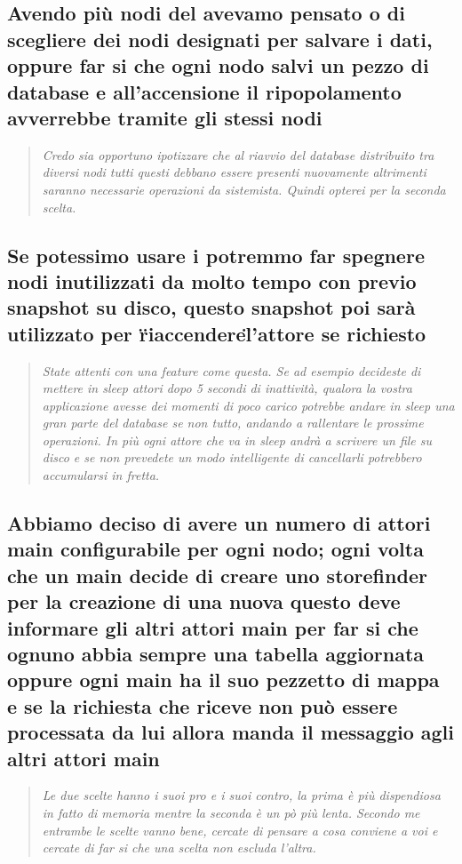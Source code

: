 \documentclass{scalatekids-article}
\begin{document}
\subsection{Avendo più nodi del  avevamo pensato o di scegliere dei nodi designati per salvare i dati, oppure far si che ogni nodo salvi un pezzo di database e all'accensione il ripopolamento avverrebbe tramite gli stessi nodi\\}
\begin{quote}
  \textit{Credo sia opportuno ipotizzare che al riavvio del database distribuito tra diversi nodi tutti questi debbano essere presenti nuovamente altrimenti saranno necessarie operazioni da sistemista. Quindi opterei per la seconda scelta.}
\end{quote}
\subsection{Se potessimo usare i  potremmo far spegnere nodi inutilizzati da molto tempo con previo snapshot su disco, questo snapshot poi sarà utilizzato per \"riaccendere\" l'attore se richiesto\\}
\begin{quote}
  \textit{State attenti con una feature come questa. Se ad esempio decideste di mettere in sleep attori dopo 5 secondi di inattività, qualora la vostra applicazione avesse dei momenti di poco carico potrebbe andare in sleep una gran parte del database se non tutto, andando a rallentare le prossime operazioni. In più ogni attore che va in sleep andrà a scrivere un file su disco e se non prevedete un modo intelligente di cancellarli potrebbero accumularsi in fretta.}
\end{quote}
\subsection{Abbiamo deciso di avere un numero di attori main configurabile per ogni nodo; ogni volta che un main decide di creare uno storefinder per la creazione di una nuova  questo deve informare gli altri attori main per far si che ognuno abbia sempre una tabella aggiornata oppure ogni main ha il suo pezzetto di mappa e se la richiesta che riceve non può essere processata da lui allora manda il messaggio agli altri attori main\\}
\begin{quote}
  \textit{Le due scelte hanno i suoi pro e i suoi contro, la prima è più dispendiosa in fatto di memoria mentre la seconda è un pò più lenta. Secondo me entrambe le scelte vanno bene, cercate di pensare a cosa conviene a voi e cercate di far si che una scelta non escluda l'altra.}
\end{quote}
\end{document}
